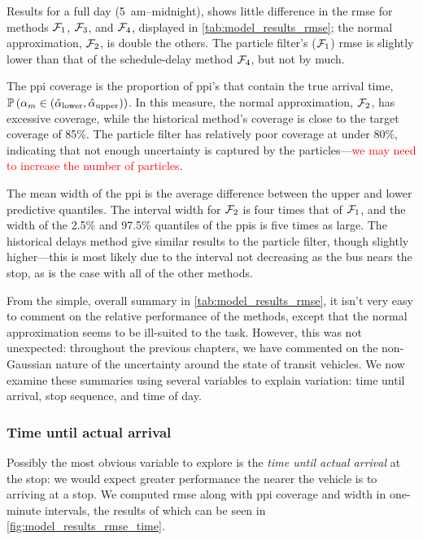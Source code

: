 Results for a full day (5~am--midnight), shows little difference in the \gls{rmse} for methods $\mathcal{F}_1$, $\mathcal{F}_3$, and $\mathcal{F}_4$, displayed in \cref{tab:model_results_rmse}; the normal approximation, $\mathcal{F}_2$, is double the others. The particle filter's ($\mathcal{F}_1$) \gls{rmse} is slightly lower than that of the schedule-delay method $\mathcal{F}_4$, but not by much.

The \gls{ppi} coverage is the proportion of \gls{ppi}'s that contain the true arrival time, $\mathbb{P}\left(\alpha_m \in (\hat\alpha_{\text{lower}},\hat\alpha_{\text{upper}})\right)$. In this measure, the normal approximation, $\mathcal{F}_2$, has excessive coverage, while the historical method's coverage is close to the target coverage of 85\%. The particle filter has relatively poor coverage at under 80\%, indicating that not enough uncertainty is captured by the particles---\textcolor{red}{we may need to increase the number of particles}.

The mean width of the \gls{ppi} is the average difference between the upper and lower predictive quantiles. The interval width for $\mathcal{F}_2$ is four times that of $\mathcal{F}_1$, and the width of the 2.5\% and 97.5\% quantiles of the \glspl{ppi} is five times as large. The historical delays method give similar results to the particle filter, though slightly higher---this is most likely due to the interval not decreasing as the bus nears the stop, as is the case with all of the other methods.

From the simple, overall summary in \cref{tab:model_results_rmse}, it isn't very easy to comment on the relative performance of the methods, except that the normal approximation seems to be ill-suited to the task. However, this was not unexpected: throughout the previous chapters, we have commented on the non-Gaussian nature of the uncertainty around the state of transit vehicles. We now examine these summaries using several variables to explain variation: time until arrival, stop sequence, and time of day.


\subsubsection{Time until actual arrival}

Possibly the most obvious variable to explore is the \emph{time until actual arrival} at the stop: we would expect greater performance the nearer the vehicle is to arriving at a stop. We computed \gls{rmse} along with \gls{ppi} coverage and width in one-minute intervals, the results of which can be seen in \cref{fig:model_results_rmse_time}.


